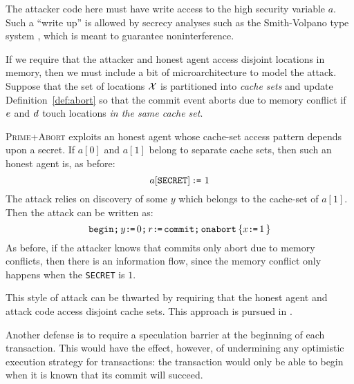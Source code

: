 \documentclass[conference]{IEEEtran}
\theoremstyle{plain}
\theoremstyle{definition}
\newcommand{\ignore}[1]{}
\begin{document}
The attacker code here must have write access to the high security variable
$a$.  Such a ``write up'' is allowed by secrecy analyses such as the
Smith-Volpano type system \cite{Smith:1998:SIF:268946.268975}, which
is meant to guarantee noninterference.

If we require that the attacker and honest agent access disjoint locations in
memory, then we must include a bit of microarchitecture to model the attack.
Suppose that the set of locations $\mathcal{X}$ is partitioned into \emph{cache
  sets} and update Definition~\ref{def:abort} so that the commit event
{aborts due to memory conflict} if $e$ and $d$ touch locations \emph{in
  the same cache set}.

\textsc{Prime+Abort} exploits an honest agent whose cache-set
access pattern depends upon a secret.
If $a[0]$ and $a[1]$ belong to separate cache sets, then
such an honest agent is, as before:
\[
  a[\texttt{SECRET}]\,\texttt{:}\mkern-1mu\texttt{=}\,\,1
\]
The attack relies on discovery of some $y$ which belongs to the cache-set of
$a[1]$.
Then the attack can be written as:
\[
  \texttt{begin}\texttt{;}\, y\texttt{:}\mkern-1mu\texttt{=}\,0\texttt{;}\, r\texttt{:}\mkern-1mu\texttt{=}\,\texttt{commit}\texttt{;}\, \texttt{onabort}\,\{ x\texttt{:}\mkern-1mu\texttt{=}\,1\,\}
\]
As before, if the attacker knows that commits only abort due to memory
conflicts, then there is an information flow, since the memory conflict
only happens when the \texttt{SECRET} is $1$.

This style of attack can be thwarted by requiring that the honest agent and
attack code access disjoint cache sets.  This approach is pursued in \cite{dawg}.

Another defense is to require a speculation barrier at the beginning of each
transaction.  This would have the effect, however, of undermining any
optimistic execution strategy for transactions: the transaction would only be
able to begin when it is known that its commit will succeed.

\end{document}
